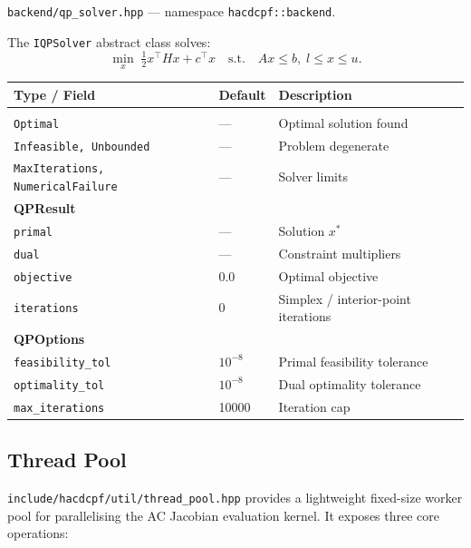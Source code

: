 \texttt{backend/qp\_solver.hpp} --- namespace \texttt{hacdcpf::backend}.

The \texttt{IQPSolver} abstract class solves:
\begin{equation}
  \min_x \;\tfrac{1}{2}x^\top H x + c^\top x \quad\text{s.t.}\quad Ax \leq b,\; l \leq x \leq u.
\end{equation}

\begin{longtable}{lll}
\hline\hline
\textbf{Type / Field} & \textbf{Default} & \textbf{Description} \\
\hline\endhead\hline\endfoot
\multicolumn{3}{l}{\textbf{QPStatus}} \\
\texttt{Optimal} & --- & Optimal solution found \\
\texttt{Infeasible, Unbounded} & --- & Problem degenerate \\
\texttt{MaxIterations, NumericalFailure} & --- & Solver limits \\
\hline
\multicolumn{3}{l}{\textbf{QPResult}} \\
\texttt{primal} & --- & Solution $x^*$ \\
\texttt{dual} & --- & Constraint multipliers \\
\texttt{objective} & 0.0 & Optimal objective \\
\texttt{iterations} & 0 & Simplex / interior-point iterations \\
\hline
\multicolumn{3}{l}{\textbf{QPOptions}} \\
\texttt{feasibility\_tol} & \(10^{-8}\) & Primal feasibility tolerance \\
\texttt{optimality\_tol} & \(10^{-8}\) & Dual optimality tolerance \\
\texttt{max\_iterations} & 10000 & Iteration cap \\
\hline\hline
\end{longtable}

\subsection{Thread Pool}
\label{sec:thread-pool}

\texttt{include/hacdcpf/util/thread\_pool.hpp} provides a lightweight fixed-size
worker pool for parallelising the AC Jacobian evaluation kernel.  It exposes
three core operations:

